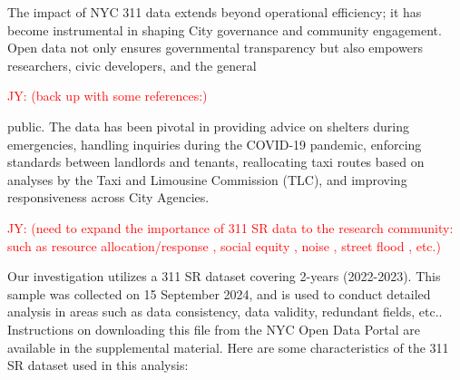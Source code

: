 \documentclass[linenumber]{jdsart}
\newcommand{\jy}[1]{\textcolor{red}{JY: (#1)}}
\begin{document}
The impact of NYC 311 data extends beyond operational efficiency; it
has become instrumental in shaping City governance and community
engagement. Open data not only ensures governmental transparency
but also empowers researchers, civic developers, and the general

\jy{back up with some references:}

  \citep{minkoff2016nyc, o2017uncharted, kontokosta2021bias}
public. The data has been pivotal in providing advice on shelters
during emergencies, handling inquiries during the COVID-19 pandemic,
enforcing standards between landlords and tenants, reallocating taxi
routes based on analyses by the Taxi and Limousine Commission (TLC),
and improving responsiveness across City Agencies.

\jy{need to expand the importance of 311 SR data to the research
  community: such as
  resource allocation/response \citep{zha2014profiling, raj2021swift},
  social equity \citep{white2018promises, kontokosta2021bias},
  noise \citep{dove2022sounds},
  street flood \citep{agonafir2022understanding}, etc.}
  
Our investigation utilizes a 311 SR dataset covering  2-years (2022-2023).
This sample was collected on 15 September 2024, and is used 
to conduct detailed analysis in areas such as data 
consistency, data validity, redundant fields, etc.. Instructions 
on downloading this file from the NYC Open Data Portal 
are available in the supplemental material. Here are some 
characteristics of the 311 SR dataset used in this analysis:
\end{document}
